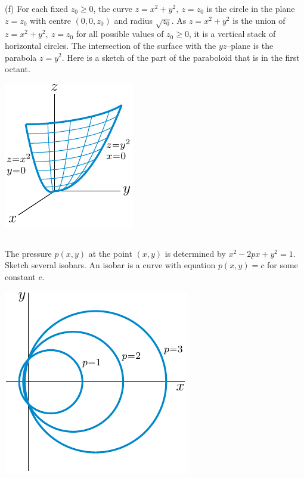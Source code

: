 \begin{solution}
(f)
For each fixed $z_0\ge 0$, the curve $z = x^2 + y^2,\ z=z_0$ is the circle in the plane $z=z_0$ with centre $(0,0,z_0)$ and radius $\sqrt{z_0}$. As 
$z = x^2 + y^2$ is the union of $z = x^2 + y^2,\ z=z_0$ for all 
possible values of $z_0\ge 0$, it is  a vertical stack of horizontal circles.
The intersection of the surface with the $yz$--plane is the parabola
$z=y^2$.  Here is a sketch of the part of the paraboloid that is in the 
first octant.

\begin{center}
     \includegraphics{fig/quarterParaboloid.pdf}
\end{center}


\end{solution}




\subsection*{\Procedural}

\begin{question}
The pressure $p(x,y)$ at the point $(x,y)$ is determined by 
$x^2-2px+y^2=1$. Sketch several isobars. An isobar is a curve with
equation $p(x,y)=c$ for some constant $c$.
\end{question}

%


\begin{answer}
\begin{center}
     \includegraphics{fig/pressure.pdf}
\end{center}

\end{answer}


